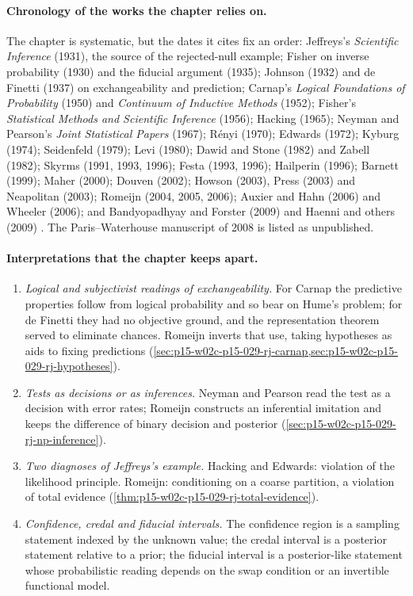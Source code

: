 \paragraph{Chronology of the works the chapter relies on.}
The chapter is systematic, but the dates it cites fix an order:
Jeffreys's \emph{Scientific Inference} (1931), the source of the
rejected-null example; Fisher on inverse probability (1930) and the
fiducial argument (1935); Johnson (1932) and de Finetti (1937) on
exchangeability and prediction; Carnap's \emph{Logical Foundations of
Probability} (1950) and \emph{Continuum of Inductive Methods} (1952);
Fisher's \emph{Statistical Methods and Scientific Inference} (1956);
Hacking (1965); Neyman and Pearson's \emph{Joint Statistical Papers}
(1967); R\'enyi (1970); Edwards (1972); Kyburg (1974); Seidenfeld (1979);
Levi (1980); Dawid and Stone (1982) and Zabell (1982); Skyrms (1991,
1993, 1996); Festa (1993, 1996); Hailperin (1996); Barnett (1999);
Maher (2000); Douven (2002); Howson (2003), Press (2003) and Neapolitan
(2003); Romeijn (2004, 2005, 2006); Auxier and Hahn (2006) and Wheeler
(2006); and Bandyopadhyay and Forster (2009) and Haenni and others
(2009) \cite[pp.~649--650]{Romeijn2011InductiveLogicStatistics}. The
Paris--Waterhouse manuscript of 2008 is listed as unpublished.

\paragraph{Interpretations that the chapter keeps apart.}
\begin{enumerate}
\item \emph{Logical and subjectivist readings of exchangeability.} For
  Carnap the predictive properties follow from logical probability and
  so bear on Hume's problem; for de Finetti they had no objective ground,
  and the representation theorem served to eliminate chances. Romeijn
  inverts that use, taking hypotheses as aids to fixing predictions
  (\cref{sec:p15-w02c-p15-029-rj-carnap,sec:p15-w02c-p15-029-rj-hypotheses}).
\item \emph{Tests as decisions or as inferences.} Neyman and Pearson
  read the test as a decision with error rates; Romeijn constructs an
  inferential imitation and keeps the difference of binary decision and
  posterior (\cref{sec:p15-w02c-p15-029-rj-np-inference}).
\item \emph{Two diagnoses of Jeffreys's example.} Hacking and Edwards:
  violation of the likelihood principle. Romeijn: conditioning on a
  coarse partition, a violation of total evidence
  (\cref{thm:p15-w02c-p15-029-rj-total-evidence}).
\item \emph{Confidence, credal and fiducial intervals.} The confidence
  region is a sampling statement indexed by the unknown value; the
  credal interval is a posterior statement relative to a prior; the
  fiducial interval is a posterior-like statement whose probabilistic
  reading depends on the swap condition or an invertible functional
  model.
\end{enumerate}


